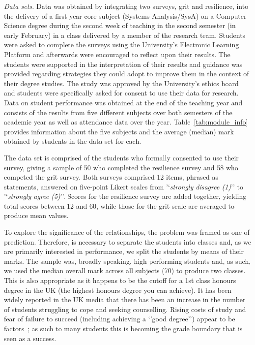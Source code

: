 \documentclass[sigconf]{acmart}
\begin{document}
{\em Data sets.}
Data was obtained by integrating two surveys, grit and resilience, into the delivery of a first year core subject (Systems Analysis/SysA) on a Computer Science degree during the second week of teaching in the second semester (in early February) in a class delivered by a member of the research team. Students were asked to complete the surveys using the University's Electronic Learning Platform and afterwards were encouraged to reflect upon their results. The students were supported in the interpretation of their results and guidance was provided regarding strategies they could adopt to improve them in the context of their degree studies. The study was approved by the University's ethics board and students were specifically asked for consent to use their data for research. Data on student performance was obtained at the end of the teaching year and consists of the results from five different subjects over both semesters of the academic year as well as attendance data over the year. Table~\ref{tab:module_info} provides information about the five subjects and the average (median) mark obtained by students in the data set for each.

The data set is comprised of the students who formally consented to use their survey, giving a sample of 50 who completed the resilience survey and 58 who competed the grit survey. Both surveys comprised 12 items, phrased as statements, answered on five-point Likert scales from '`{\emph{strongly disagree (1)}}'' to '`{\emph{strongly agree (5)}}''. Scores for the resilience survey are added together, yielding total scores between 12 and 60, while those for the grit scale are averaged to produce mean values.

To explore the significance of the relationships, the problem was framed as one of prediction. Therefore, is necessary to separate the students into classes and, as we are primarily interested in performance, we split the students by means of their marks. The sample was, broadly speaking, high performing students and, as such, we used the median overall mark across all subjects (70) to produce two classes. This is also appropriate as it happens to be the cutoff for a 1st class honours degree in the UK (the highest honours degree you can achieve). It has been widely reported in the UK media that there has been an increase in the number of students struggling to cope and seeking counselling. Rising costs of study and fear of failure to succeed (including achieving a `'good degree'') appear to be factors~\cite{BBC}; as such to many students this is becoming the grade boundary that is seen as a success.
\end{document}
